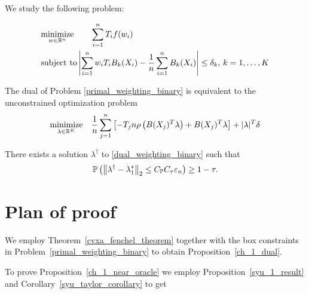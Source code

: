 
We study the following problem:

\begin{align}
  \label{primal_weighting_binary}
  \begin{split}
  &\underset{w \in \mathbb{R}^n}{\text{minimize}}
  \qquad
  \sum_{i = 1}^{n} T_i f(w_i)
  \\
  &\text{subject to}
  \left| 
    \sum_{i = 1}^{n} w_i T_i B_k(X_i)
    - 
    \frac{1}{n} \sum_{i = 1}^{n} B_k(X_i)
  \right|
  \le 
  \delta_k,\,
  k = 1, \ldots, K
  \end{split}
\end{align}


\begin{proposition}
  \label{ch_1_dual}
  The dual of Problem \eqref{primal_weighting_binary} is equivalent to the unconstrained optimization problem
  \begin{gather}
    \label{dual_weighting_binary}
      \underset{\lambda \in \mathbb{R}^K}{\text{minimize}}
      \quad
      \frac{1}{n}
      \sum_{j = 1}^{n} 
      \left[ 
        -T_j n 
        \rho 
        \left( 
          B(X_j)^T \lambda
        \right)
      +
      B(X_j)^T \lambda
      \right]
      +
      |\lambda|^T \delta
  \end{gather}
\end{proposition}


\begin{proposition}
  \label{ch_1_near_oracle}
  There exists a solution $\lambda^\dagger$ 
  to \eqref{dual_weighting_binary}
  such that
  \begin{gather}
    \mathbb{P}
    \left( 
      \left\lVert
        \lambda^\dagger
        -
        \lambda^*_1
      \right\rVert_2
      \le
      C_{\mathbb{P}} C_\tau \varepsilon_n
    \right)
    \ge 
    1 - \tau
    .
  \end{gather}
\end{proposition}


\section{Plan of proof}
We employ 
Theorem~\ref{cvxa_fenchel_theorem}
together with the box constraints in Problem~\eqref{primal_weighting_binary}
to obtain Proposition~\ref{ch_1_dual}.

To prove Proposition~\ref{ch_1_near_oracle}
we employ
Proposition~\ref{syu_1_result}
and 
Corollary~\ref{syu_taylor_corollary}
to get

